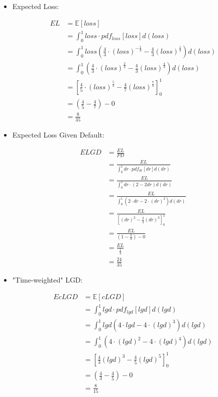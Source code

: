 \documentclass[11pt]{article}
\newcommand{\Exp}{\mathbb{E}}
\begin{document}
\begin{itemize}
\item Expected Loss:

$$
\begin{aligned}
EL &= \Exp[loss] \\
&= \int_0^1 loss \cdot pdf_{loss}[loss] d(loss) \\
&= \int_0^1 loss 
\left( 
\frac{4}{3} \cdot (loss)^{-\frac{1}{3}} 
-\frac{4}{3} (loss)^{\frac{1}{3}}
\right) d(loss) \\
&= \int_0^1 \left( 
\frac{4}{3} \cdot (loss)^{\frac{2}{3}} 
-\frac{4}{3} (loss)^{\frac{4}{3}}
\right) d(loss) \\
&= \left[
\frac{4}{5} \cdot (loss)^{\frac{5}{3}} 
-\frac{4}{7} (loss)^{\frac{7}{3}}
\right]_0^1 \\
&= \left(\frac{4}{5} - \frac{4}{7} \right) - 0 \\
&= \frac{8}{35}
\end{aligned}
$$

\newpage

\item Expected Loss Given Default:

$$
\begin{aligned}
ELGD &= \frac{EL}{PD} \\
&= \frac{EL}{\int_0^1 dr \cdot pdf_{dr}[dr] d(dr)} \\
&= \frac{EL}{\int_0^1 dr \cdot (2 - 2dr) d(dr)} \\
&= \frac{EL}{\int_0^1 
\left(
2 \cdot dr - 2 \cdot (dr)^2 
\right) d(dr)} \\
&= \frac{EL}{
\left[
(dr)^2 - \frac{2}{3} (dr)^3
\right]_0^1} \\
&= \frac{EL}{
\left( 1 - \frac{2}{3} \right) - 0} \\
&= \frac{EL}{\frac{1}{3}} \\
&= \frac{24}{35}
\end{aligned}
$$


\item "Time-weighted" LGD:

$$
\begin{aligned}
EcLGD &= \Exp[cLGD] \\ 
&= \int_0^1 lgd \cdot pdf_{lgd}[lgd] d(lgd) \\
&= \int_0^1 lgd
\left(
4 \cdot lgd - 4 \cdot (lgd)^3
\right) d(lgd) \\
&= \int_0^1
\left(
4 \cdot (lgd)^2 - 4 \cdot (lgd)^4
\right) d(lgd) \\
&= \left[
\frac{4}{3} (lgd)^3 - \frac{4}{5} (lgd)^5
\right]_0^1 \\
&= \left(\frac{4}{3} - \frac{4}{5} \right) - 0 \\
&= \frac{8}{15}
\end{aligned}
$$
\end{itemize}
\end{document}
